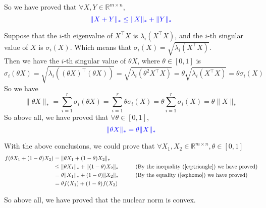 So we have proved that $\forall X,Y\in\mathbb{R}^{m\times n}$,
\begin{equation}
\textcolor{blue}{\|X+Y\|_* \leq \|X\|_* + \|Y\|_*}
\label{eq:triangle}
\end{equation}


Suppose that the $i$-th eigenvalue of $X^{\top}X$ is $\lambda_i(X^{\top}X)$, and the $i$-th singular value of $X$ is $\sigma_i(X)$. Which means that $\sigma_i(X)=\sqrt{\lambda_i(X^{\top}X)}$. \\
Then we have the $i$-th singular value of $\theta X$, where $\theta\in[0,1]$ is
$$\sigma_i(\theta X)=\sqrt{\lambda_i((\theta X)^{\top}(\theta X))}=\sqrt{\lambda_i(\theta^2X^{\top}X)}=\theta\sqrt{\lambda_i(X^{\top}X)}=\theta\sigma_i(X)$$
So we have
$$\|\theta X\|_* = \sum_{i=1}^{r}\sigma_i(\theta X) = \sum_{i=1}^{r}\theta\sigma_i(X) = \theta\sum_{i=1}^{r}\sigma_i(X) = \theta\|X\|_*$$
So above all, we have proved that $\forall\theta\in[0,1]$,
\begin{equation}
\textcolor{blue}{\|\theta X\|_* = \theta\|X\|_*}
\label{eq:homo}
\end{equation}


With the above conclusions, we could prove that $\forall X_1,X_2\in\mathbb{R}^{m\times n}, \theta\in[0,1]$
\begin{align*}
f(\theta X_1 + (1-\theta)X_2) &= \|\theta X_1 + (1-\theta)X_2\|_* \\
&\leq \|\theta X_1\|_* + \|(1-\theta)X_2\|_* \text{\quad\quad\quad (By the inequality (\ref{eq:triangle}) we have proved)} \\
&= \theta\|X_1\|_* + (1-\theta)\|X_2\|_* \text{\quad\quad\quad (By the equality (\ref{eq:homo}) we have proved)} \\
&= \theta f(X_1) + (1-\theta)f(X_2)
\end{align*}

So above all, we have proved that the nuclear norm is convex.

\newpage